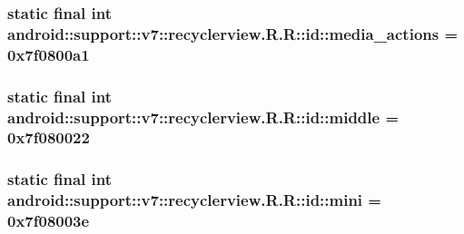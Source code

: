 \hypertarget{classandroid_1_1support_1_1v7_1_1recyclerview_1_1_r_1_1id_4bcc25374a378d139c0504fca6ad6326}{
\subsubsection[{media\_\-actions}]{\setlength{\rightskip}{0pt plus 5cm}static final int android::support::v7::recyclerview.R.R::id::media\_\-actions = 0x7f0800a1}}
\label{classandroid_1_1support_1_1v7_1_1recyclerview_1_1_r_1_1id_4bcc25374a378d139c0504fca6ad6326}


\hypertarget{classandroid_1_1support_1_1v7_1_1recyclerview_1_1_r_1_1id_8c051154c62372a2478f1bd6c574cc1a}{
\subsubsection[{middle}]{\setlength{\rightskip}{0pt plus 5cm}static final int android::support::v7::recyclerview.R.R::id::middle = 0x7f080022}}
\label{classandroid_1_1support_1_1v7_1_1recyclerview_1_1_r_1_1id_8c051154c62372a2478f1bd6c574cc1a}


\hypertarget{classandroid_1_1support_1_1v7_1_1recyclerview_1_1_r_1_1id_9625d1e8fe101a7bb021ebfa761087ac}{
\subsubsection[{mini}]{\setlength{\rightskip}{0pt plus 5cm}static final int android::support::v7::recyclerview.R.R::id::mini = 0x7f08003e}}
\label{classandroid_1_1support_1_1v7_1_1recyclerview_1_1_r_1_1id_9625d1e8fe101a7bb021ebfa761087ac}


